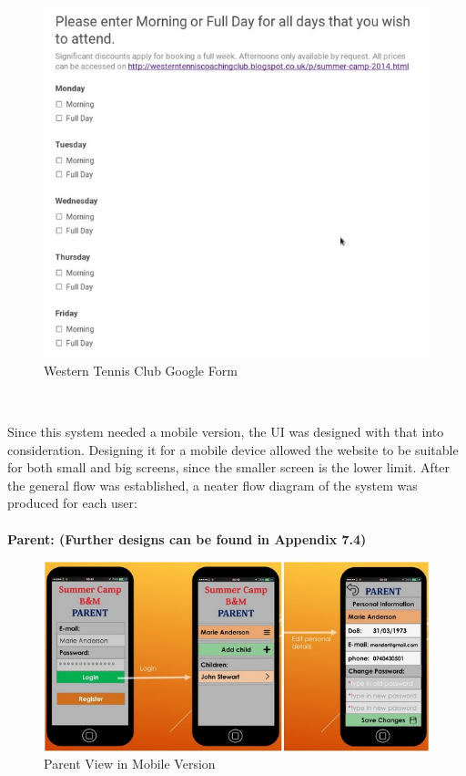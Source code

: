 \documentclass{l3proj}
\begin{document}
\\
{
\begin{figure}[h]
\caption{Western Tennis Club Google Form}
\centering
\includegraphics[scale=0.45]{googleDocsForm.jpg}
\end{figure}
}
\\
\par
Since this system needed a mobile version, the UI was designed with that into consideration. Designing it for a mobile device allowed the website to be suitable for both small and big screens, since the smaller screen is the lower limit. After the general flow was established, a neater flow diagram of the system was produced for each user:\\
\\ \textbf{Parent: (Further designs can be found in Appendix 7.4)}\\
{
\begin{figure}[h]
\caption{Parent View in Mobile Version}
\centering
\includegraphics[scale=0.60]{diagramdraft2Parent.jpg}
\end{figure}
}
\end{document}
